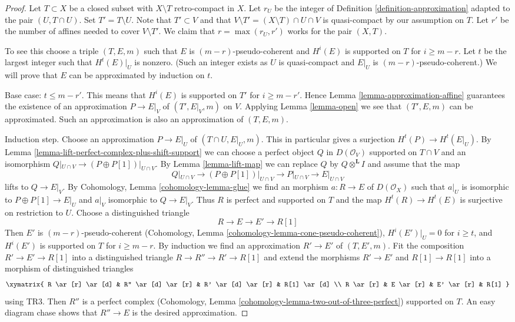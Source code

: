 \begin{proof}
Let $T \subset X$ be a closed subset with $X \setminus T$ retro-compact
in $X$. Let $r_U$ be the integer of Definition \ref{definition-approximation}
adapted to the pair $(U, T \cap U)$.
Set $T' = T \setminus U$. Note that
$T' \subset V$ and that $V \setminus T' = (X \setminus T) \cap U \cap V$
is quasi-compact by our assumption on $T$.
Let $r'$ be the number of affines needed to cover $V \setminus T'$.
We claim that $r = \max(r_U, r')$ works for the pair $(X, T)$.

\medskip\noindent
To see this choose a triple $(T, E, m)$ such that $E$ is
$(m - r)$-pseudo-coherent and $H^i(E)$ is supported on $T$ for
$i \geq m - r$. Let $t$ be the largest integer such that
$H^t(E)|_U$ is nonzero. (Such an integer exists as $U$ is quasi-compact
and $E|_U$ is $(m - r)$-pseudo-coherent.)
We will prove that $E$ can be approximated by induction on $t$.

\medskip\noindent
Base case: $t \leq m - r'$. This means that $H^i(E)$ is supported
on $T'$ for $i \geq m - r'$. Hence
Lemma \ref{lemma-approximation-affine}
guarantees the existence of an approximation
$P \to E|_V$ of $(T', E|_V, m)$ on $V$.
Applying Lemma \ref{lemma-open} we see that
$(T', E, m)$ can be approximated. Such an approximation
is also an approximation of $(T, E, m)$.

\medskip\noindent
Induction step. Choose an approximation $P \to E|_U$
of $(T \cap U, E|_U, m)$. This in particular gives a surjection
$H^t(P) \to H^t(E|_U)$. By
Lemma \ref{lemma-lift-perfect-complex-plus-shift-support}
we can choose a perfect object $Q$ in $D(\mathcal{O}_V)$
supported on $T \cap V$ and an isomorphism
$Q|_{U \cap V} \to (P \oplus P[1])|_{U \cap V}$.
By Lemma \ref{lemma-lift-map} we can replace $Q$ by
$Q \otimes^\mathbf{L} I$
and assume that the map
$$
Q|_{U \cap V} \to (P \oplus P[1])|_{U \cap V}
\longrightarrow P|_{U \cap V}
\longrightarrow
E|_{U \cap V}
$$
lifts to $Q \to E|_V$. By
Cohomology, Lemma \ref{cohomology-lemma-glue}
we find an morphism $a : R \to E$ of $D(\mathcal{O}_X)$
such that $a|_U$ is isomorphic to $P \oplus P[1] \to E|_U$
and $a|_V$ isomorphic to $Q \to E|_V$.
Thus $R$ is perfect and supported on $T$
and the map $H^t(R) \to H^t(E)$ is surjective on restriction to $U$.
Choose a distinguished triangle
$$
R \to E \to E' \to R[1]
$$
Then $E'$ is $(m - r)$-pseudo-coherent
(Cohomology, Lemma \ref{cohomology-lemma-cone-pseudo-coherent}),
$H^i(E')|_U = 0$ for $i \geq t$, and
$H^i(E')$ is supported on $T$ for $i \geq m - r$.
By induction we find an approximation $R' \to E'$
of $(T, E', m)$. Fit the composition $R' \to E' \to R[1]$
into a distinguished triangle $R \to R'' \to R' \to R[1]$
and extend the morphisms $R' \to E'$ and $R[1] \to R[1]$ into
a morphism of distinguished triangles
$$
\xymatrix{
R \ar[r] \ar[d] & R'' \ar[d] \ar[r] & R' \ar[d] \ar[r] & R[1] \ar[d] \\
R \ar[r] &  E \ar[r] & E' \ar[r] & R[1]
}
$$
using TR3. Then $R''$ is a perfect complex
(Cohomology, Lemma \ref{cohomology-lemma-two-out-of-three-perfect})
supported on $T$.
An easy diagram chase shows that $R'' \to E$ is the desired
approximation.
\end{proof}

